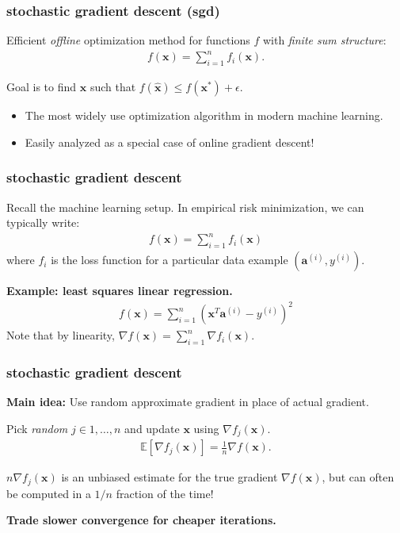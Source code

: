 \documentclass[compress]{beamer}
\newcommand{\bv}[1]{\mathbf{#1}}
\newcommand{\E}{\mathbb{E}}
\begin{document}
\begin{frame}
	\frametitle{stochastic gradient descent (sgd)}
	Efficient \emph{offline} optimization method for functions $f$ with \emph{finite sum structure}:
	\begin{align*}
		f(\bv{x}) = \sum_{i=1}^n f_i(\bv{x}).
	\end{align*}
	
	
	Goal is to find $\hat{\bv{x}}$ such that $f(\hat{\bv{x}}) \leq f(\bv{x}^*) + \epsilon$. 
	
	\begin{itemize}
		\item The most widely use optimization algorithm in modern machine learning. 
		\item Easily analyzed as a special case of {online} gradient descent! 
	\end{itemize}
\end{frame}

\begin{frame}[t]
	\frametitle{stochastic gradient descent}
	Recall the machine learning setup. In empirical risk minimization, we can typically write:
	\begin{align*}
		f(\bv{x}) = \sum_{i=1}^n f_i(\bv{x})
	\end{align*}
	where $f_i$ is the loss function for a particular data example $(\bv{a}^{(i)},y^{(i)} )$.
	\vspace{1em}
	
	\textbf{Example: least squares linear regression.}
	\begin{align*}
		f(\bv{x}) = \sum_{i=1}^n (\bv{x}^T\bv{a}^{(i)} - y^{(i)})^2
	\end{align*}
Note that by linearity, $\nabla f(\bv{x}) = \sum_{i=1}^n \nabla f_i(\bv{x})$. 
\end{frame}

\begin{frame}
	\frametitle{stochastic gradient descent}
	{\textbf{Main idea:} Use random approximate gradient in place of actual gradient.}
	
	Pick \emph{random} $j \in 1, \ldots, n$ and update $\bv{x}$  using $\nabla f_j(\bv{x})$. 
	\begin{align*}
		\E\left[\nabla f_j(\bv{x})\right] = \frac{1}{n}\nabla f(\bv{x}).
	\end{align*}

\vspace{2em}
	$n \nabla f_j(\bv{x})$ is an unbiased estimate for the true gradient $\nabla f(\bv{x})$, but can often be computed in a $1/n$ fraction of the time!
	

	
	\begin{center}
		\alert{\textbf{Trade slower convergence for cheaper iterations.}}
	\end{center}
\end{frame}
\end{document}

